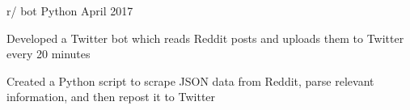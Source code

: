 \documentclass[]{awesome-cv}
\begin{document}
\begin{cventries}
    \cventry
    {}
    {r/ bot}
    {Python}
    {April 2017}
    {\begin{cvitems}
        \vspace{-4mm}
        \item {Developed a Twitter bot which reads Reddit posts and uploads them to Twitter every 20 minutes}
        \item {Created a Python script to scrape JSON data from Reddit, parse relevant information, and then repost it to Twitter}
    \end{cvitems}}
    \vspace{-2mm}

\end{cventries}
\vspace{-10mm}
\let\clearpage\relax %
\end{document}
